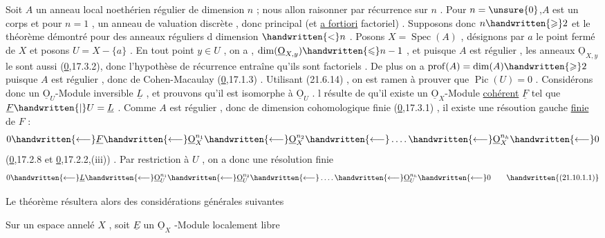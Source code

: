 Soit $A$ un anneau local noethérien régulier de dimension $n$ ; nous allon raisonner par récurrence sur $n$ . Pour $n=\unsure{0}$,$A$ est un corps et pour $n=1$ ,
un anneau de valuation discrète , donc principal (et \uline{a fortiori} factoriel) . Supposons donc $n\handwritten{\geqslant}2$ et le théorème démontré pour des anneaux réguliers d dimension $\handwritten{<}n$ . Posons $X=\operatorname{Spec}(A)$ , désignons par $a$ le point fermé de $X$ et posons $U=X-\{a\}$ . En tout point $y\in U$ , on a ,
$\dim(\underline{\mathrm O}_{X,y})\handwritten{\leqslant}n-1$ , et puisque $A$ est régulier , les anneaux $\underline{\mathrm O}_{X,y}$ le sont aussi (\uline{0},17.3.2), donc l'hypothèse de récurrence entraîne qu'ils sont factoriels . De plus on a $\operatorname{prof}(A)=\dim(A)\handwritten{\geqslant}2$ puisque $A$ est régulier , donc de Cohen-Macaulay (\uline{0},17.1.3) . Utilisant (21.6.14) , on est ramen à prouver que $\operatorname{Pic}(U)=0$ . Considérons donc un $\underline{\mathrm O}_U$-Module inversible $\underline L$ , et prouvons qu'il est isomorphe à $\underline{\mathrm O}_U$ .  l résulte de   qu'il existe un $\underline{\mathrm O}_X$-Module \uline{cohérent} $\underline F$ tel que $\underline F\handwritten{\mid}U=\underline L$ . Comme $A$ est régulier , donc de dimension cohomologique finie (\uline{0},17.3.1) , il existe une résoution gauche \uline{finie} de $F$ :
\[
0\handwritten{\longleftarrow}\underline F\handwritten{\longleftarrow}\underline{\mathrm O}_X^{n_1}\handwritten{\longleftarrow}\underline{\mathrm O}_X^{n_2}\handwritten{\longleftarrow}\mathinner{\ldotp\ldotp\ldotp\ldotp}\handwritten{\longleftarrow}\underline{\mathrm O}_X^{n_h}\handwritten{\longleftarrow}0
\]
(\uline{0},17.2.8 et \uline{0},17.2.2,(iii)) . Par restriction à $U$ , on a donc une résolution finie
\begingroup\makeatletter\tagsleft@true\makeatother
\[
0\handwritten{\longleftarrow}\underline L\handwritten{\longleftarrow}\underline{\mathrm O}_U^{n_1}\handwritten{\longleftarrow}\underline{\mathrm O}_U^{n_2}\handwritten{\longleftarrow}\mathinner{\ldotp\ldotp\ldotp\ldotp}\handwritten{\longleftarrow}\underline{\mathrm O}_U^{n_h}\handwritten{\longleftarrow}0
\tag*{\handwritten{(21.10.1.1)}}
\]
\endgroup

Le théorème résultera alors des considérations générales suivantes \handwritten{\unsure{;|:}}

Sur un espace  annelé $X$ , soit $\underline E$ un $\underline{\mathrm O}_X$ -Module localement libre
